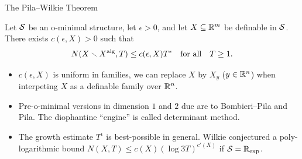\documentclass{beamer}
\begin{document}
\begin{frame}{The Pila--Wilkie Theorem}
  \begin{theorem}
    Let ${\mathcal S}$ be an o-minimal structure, let $\epsilon>0$, and let
    $X\subseteq{\mathbb{R}}^m$ be definable in ${\mathcal S}$. There exists $c(\epsilon,X)>0$
    such that
    \begin{equation*}
      N(X\smallsetminus X^{\mathrm{alg}},T)\le c(\epsilon,X) T^\epsilon \quad\text{for
        all}\quad T\ge 1.
    \end{equation*}
  \end{theorem}

  \begin{itemize}
   \item  $c(\epsilon,X)$ is uniform in families, we
     can replace $X$ by $X_y$ ($y\in{\mathbb{R}}^n$)
     when interpeting $X$ as a definable
    family over ${\mathbb{R}}^n$.

  \item Pre-o-minimal versions in  dimension $1$ and $2$
    due are to Bombieri--Pila and Pila. The diophantine ``engine'' is
    called \alert{determinant method}.
    
  \item The growth estimate $T^\epsilon$ is best-possible in general.
    Wilkie conjectured a
    poly-logarithmic bound $N(X,T)\le c(X)(\log 3T)^{c'(X)}$ if ${\mathcal S}={{\mathbb{R}}_{\mathrm{exp}}}$.  
  \end{itemize}
\end{frame}
\end{document}
